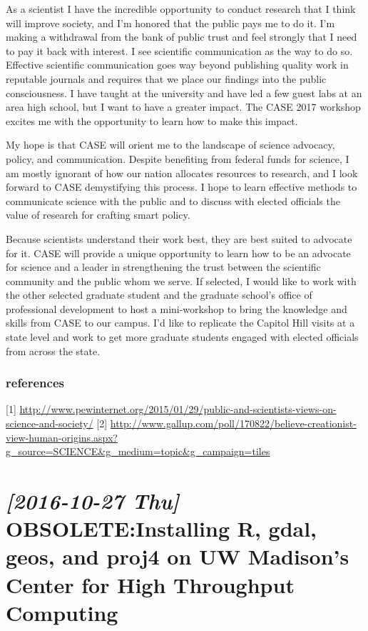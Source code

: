 \documentclass{article}
\begin{document}
As a scientist I have the incredible opportunity to conduct research
that I think will improve society, and I'm honored that the public
pays me to do it.  I'm making a withdrawal from the bank of public
trust and feel strongly that I need to pay it back with interest.  I
see scientific communication as the way to do so.  Effective
scientific communication goes way beyond publishing quality work in
reputable journals and requires that we place our findings into the
public consciousness.  I have taught at the university and have led a
few guest labs at an area high school, but I want to have a greater
impact.  The CASE 2017 workshop excites me with the opportunity to
learn how to make this impact.

My hope is that CASE will orient me to the landscape of science
advocacy, policy, and communication. Despite benefiting from federal
funds for science, I am mostly ignorant of how our nation allocates
resources to research, and I look forward to CASE demystifying this
process. I hope to learn effective methods to communicate science with
the public and to discuss with elected officials the value of research
for crafting smart policy.

Because scientists understand their work best, they are best suited to
advocate for it.  CASE will provide a unique opportunity to learn
how to be an advocate for science and a leader in strengthening the
trust between the scientific community and the public whom we serve.
If selected, I would like to work with the other selected graduate
student and the graduate school's office of professional development
to host a mini-workshop to bring the knowledge and skills from
CASE to our campus.  I'd like to replicate the Capitol Hill visits at a
state level and work to get more graduate students engaged with
elected officials from across the state.

\subsubsection*{references}
\label{sec:orgfeb99e3}
[1] \url{http://www.pewinternet.org/2015/01/29/public-and-scientists-views-on-science-and-society/}
[2] \url{http://www.gallup.com/poll/170822/believe-creationist-view-human-origins.aspx?g\_source=SCIENCE\&g\_medium=topic\&g\_campaign=tiles}

\section*{\textit{[2016-10-27 Thu] } OBSOLETE:Installing R, gdal, geos, and proj4 on UW Madison's Center for High Throughput Computing}
\label{sec:org1ebb2e3}
\end{document}
